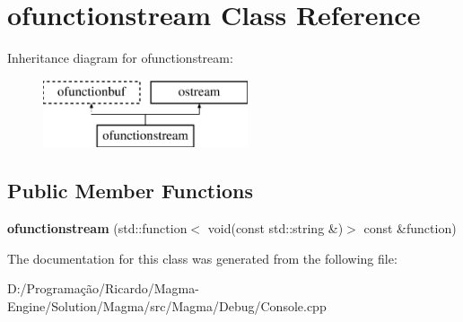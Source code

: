 \hypertarget{classofunctionstream}{}\section{ofunctionstream Class Reference}
\label{classofunctionstream}
Inheritance diagram for ofunctionstream\+:\begin{figure}[H]
\begin{center}
\leavevmode
\includegraphics[height=2.000000cm]{classofunctionstream}
\end{center}
\end{figure}
\subsection*{Public Member Functions}
\begin{DoxyCompactItemize}
\item 
\mbox{\label{classofunctionstream_a155ec3c7c07fe88d9bd0fe6beb20718f}} 
{\bfseries ofunctionstream} (std\+::function$<$ void(const std\+::string \&)$>$ const \&function)
\end{DoxyCompactItemize}


The documentation for this class was generated from the following file\+:\begin{DoxyCompactItemize}
\item 
D\+:/\+Programação/\+Ricardo/\+Magma-\/\+Engine/\+Solution/\+Magma/src/\+Magma/\+Debug/Console.\+cpp\end{DoxyCompactItemize}
